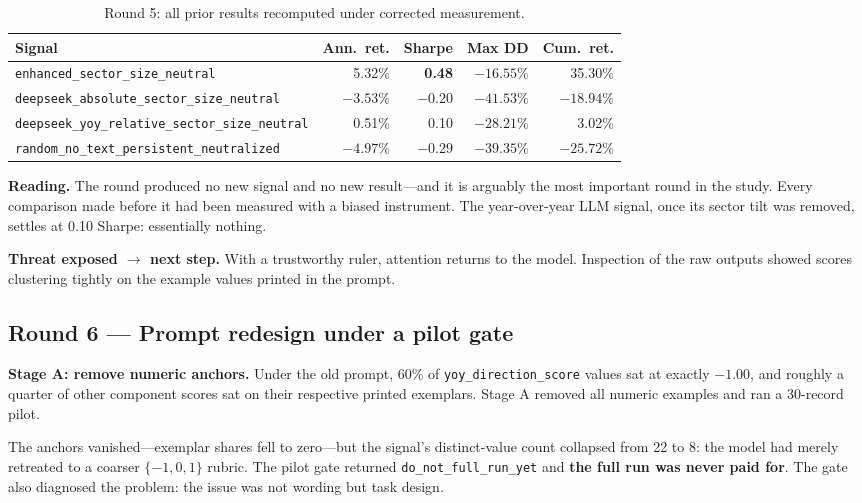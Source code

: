 \documentclass[11pt]{article}
\newcommand{\sig}[1]{\texttt{#1}}
\begin{document}
\begin{table}[H]
\centering\small
\caption{Round 5: all prior results recomputed under corrected measurement.}
\begin{tabular}{l r r r r}
\toprule
\textbf{Signal} & \textbf{Ann.\ ret.} & \textbf{Sharpe} & \textbf{Max DD} & \textbf{Cum.\ ret.} \\
\midrule
\sig{enhanced\_sector\_size\_neutral}                & 5.32\%    & \textbf{0.48} & $-16.55\%$ & 35.30\% \\
\sig{deepseek\_absolute\_sector\_size\_neutral}      & $-3.53\%$ & $-0.20$ & $-41.53\%$ & $-18.94\%$ \\
\sig{deepseek\_yoy\_relative\_sector\_size\_neutral} & 0.51\%    & 0.10 & $-28.21\%$ & 3.02\% \\
\sig{random\_no\_text\_persistent\_neutralized}      & $-4.97\%$ & $-0.29$ & $-39.35\%$ & $-25.72\%$ \\
\bottomrule
\end{tabular}
\end{table}

\textbf{Reading.} The round produced no new signal and no new result---and it is arguably
the most important round in the study. Every comparison made before it had been measured
with a biased instrument. The year-over-year LLM signal, once its sector tilt was removed,
settles at 0.10 Sharpe: essentially nothing.

\textbf{Threat exposed $\rightarrow$ next step.} With a trustworthy ruler, attention returns
to the model. Inspection of the raw outputs showed scores clustering tightly on the
example values printed in the prompt.

\subsection{Round 6 --- Prompt redesign under a pilot gate}
\label{sec:r6}

\textbf{Stage A: remove numeric anchors.} Under the old prompt, 60\% of
\sig{yoy\_direction\_score} values sat at exactly $-1.00$, and roughly a quarter of other
component scores sat on their respective printed exemplars. Stage A removed all numeric
examples and ran a 30-record pilot.

The anchors vanished---exemplar shares fell to zero---but the signal's distinct-value count
collapsed from 22 to 8: the model had merely retreated to a coarser $\{-1, 0, 1\}$ rubric.
The pilot gate returned \sig{do\_not\_full\_run\_yet} and \textbf{the full run was never
paid for}. The gate also diagnosed the problem: the issue was not wording but task design.
\end{document}
